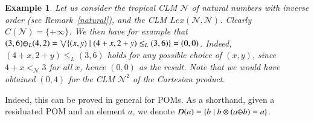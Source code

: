 \documentclass[a4paper]{elsarticle}
\newtheorem{example}{Example}
\newcommand{\1}{\mathbf{1}}
\def\odiv{{ \ominus\hspace{-8pt}:}\;}
\begin{document}
\begin{example}
	Let us consider the tropical CLM $\mathcal{N}$ of natural numbers with inverse order 
	(see Remark~\ref{natural}),
	and the CLM $Lex(\mathcal{N},\mathcal{N})$. Clearly $C(\mathcal{N}) = \{+\infty\}$. We then have for example
	that
	$(3, 6) \odiv_L (4, 2) = \bigvee \{(x, y) \mid (4 + x, 2 + y) \leq_L (3, 6)\} = (0,0)$.
	Indeed, $(4 + x, 2 + y) \leq_L (3, 6)$ holds for any possible choice of $(x, y)$,
	since $4 + x <_\mathcal{N} 3$ for all $x$, hence $(0,0)$ as the result.
	Note that we would have obtained $(0, 4)$ for the CLM $\mathcal{N}^2$ of the Cartesian product.
\end{example}

Indeed, this can be proved in general for POMs. As a shorthand, given a residuated POM 
and an element $a$, we denote $D(a) = \{ b \mid b \otimes (a \odiv b) = a\}$.
\end{document}
